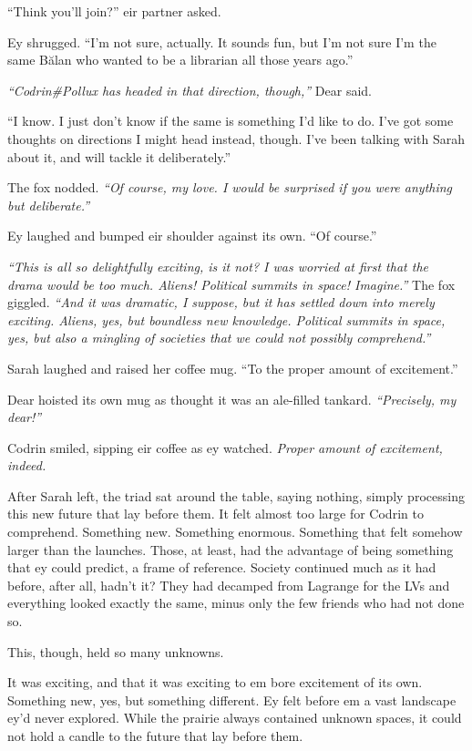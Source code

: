 ``Think you'll join?'' eir partner asked.

Ey shrugged. ``I'm not sure, actually. It sounds fun, but I'm not sure I'm the same Bălan who wanted to be a librarian all those years ago.''

\emph{``Codrin\#Pollux has headed in that direction, though,''} Dear said.

``I know. I just don't know if the same is something I'd like to do. I've got some thoughts on directions I might head instead, though. I've been talking with Sarah about it, and will tackle it deliberately.''

The fox nodded. \emph{``Of course, my love. I would be surprised if you were anything but deliberate.''}

Ey laughed and bumped eir shoulder against its own. ``Of course.''

\emph{``This is all so delightfully exciting, is it not? I was worried at first that the drama would be too much. Aliens! Political summits in space! Imagine.''} The fox giggled. \emph{``And it was dramatic, I suppose, but it has settled down into merely exciting. Aliens, yes, but boundless new knowledge. Political summits in space, yes, but also a mingling of societies that we could not possibly comprehend.''}

Sarah laughed and raised her coffee mug. ``To the proper amount of excitement.''

Dear hoisted its own mug as thought it was an ale-filled tankard. \emph{``Precisely, my dear!''}

Codrin smiled, sipping eir coffee as ey watched. \emph{Proper amount of excitement, indeed.}

After Sarah left, the triad sat around the table, saying nothing, simply processing this new future that lay before them. It felt almost too large for Codrin to comprehend. Something new. Something enormous. Something that felt somehow larger than the launches. Those, at least, had the advantage of being something that ey could predict, a frame of reference. Society continued much as it had before, after all, hadn't it? They had decamped from Lagrange for the LVs and everything looked exactly the same, minus only the few friends who had not done so.

This, though, held so many unknowns.

It was exciting, and that it was exciting to em bore excitement of its own. Something new, yes, but something different. Ey felt before em a vast landscape ey'd never explored. While the prairie always contained unknown spaces, it could not hold a candle to the future that lay before them.

